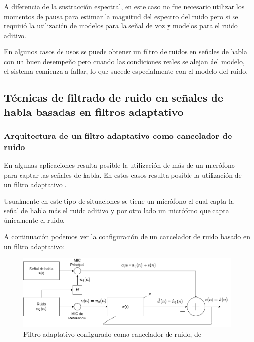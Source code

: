 A diferencia de la sustracción espectral, en este caso no fue necesario utilizar los momentos de pausa para estimar la magnitud del espectro del ruido pero si se requirió la utilización de modelos para la señal de voz y modelos para el ruido aditivo. 

En algunos casos de usos se puede obtener un filtro de ruidos en señales de habla con un buen desempeño pero cuando las condiciones reales se alejan del modelo, el sistema comienza a fallar, lo que sucede especialmente con el modelo del ruido.

\subsection{Técnicas de filtrado de ruido en señales de habla basadas en filtros adaptativo}
\label{sec:adaptive_filter}

\subsubsection{Arquitectura de un filtro adaptativo como cancelador de ruido}
\label{sec:adaptive_filter_architecture}

En algunas aplicaciones resulta posible la utilización de más de un micrófono para captar las señales de habla. En estos casos resulta posible la utilización de un filtro adaptativo \cite{fundamentals_of_adaptive_filtering}.

Usualmente en este tipo de situaciones se tiene un micrófono el cual capta la señal de habla más el ruido aditivo y por otro lado un micrófono que capta únicamente el ruido.

A continuación podemos ver la configuración de un cancelador de ruido basado en un filtro adaptativo:

\begin{figure}[H]
	\centering
	\centerline{\includegraphics[scale=0.5]{images/ch3/af-se-setup.png}}
	\caption{Filtro adaptativo configurado como cancelador de ruido, de \cite{a_family_of_adaptive_filter_slgorithms_in_noise_cancellation_for_speech_enhancement}}
	\label{fig:ch3_af-se-setup}
\end{figure}

